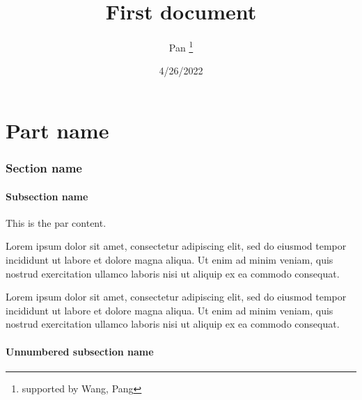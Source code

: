 \documentclass[12pt, letterpaper]{article}
\title{First document}
\author{Pan \thanks{supported by Wang, Pang}}
\date{4/26/2022}
\begin{document}
	
	\begin{titlepage}
		\maketitle
	\end{titlepage}
\tableofcontents
\newpage

\part{Part name}
\section{Section name}
\subsection{Subsection name}
This is the par content.
\par
Lorem ipsum dolor sit amet, consectetur adipiscing elit, sed do eiusmod tempor incididunt ut labore et dolore magna aliqua. Ut enim ad minim veniam, quis nostrud exercitation ullamco laboris nisi ut aliquip ex ea commodo consequat.
\par
Lorem ipsum dolor sit amet, consectetur adipiscing elit, sed do eiusmod tempor incididunt ut labore et dolore magna aliqua. Ut enim ad minim veniam, quis nostrud exercitation ullamco laboris nisi ut aliquip ex ea commodo consequat.
\subsection{Unnumbered subsection name}
\end{document}
